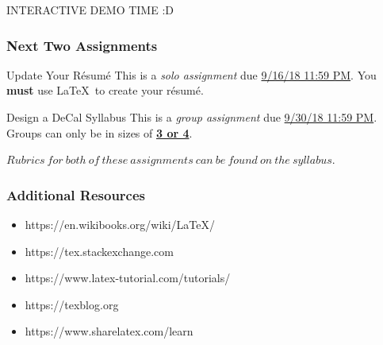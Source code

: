 \documentclass[10pt,xcolor={table,dvipsnames},t]{beamer}
\begin{document}
\begin{frame}
\Huge{INTERACTIVE DEMO TIME :D}
\end{frame}

\begin{frame}
\frametitle{Next Two Assignments}
\begin{block}{Update Your R\'esum\'e}
This is a \textit{solo assignment} due \underline{9/16/18 11:59 PM}. You \textbf{must} use \LaTeX \ to create your r\'esum\'e.
\end{block}

\begin{block}{Design a DeCal Syllabus}
This is a \textit{group assignment} due \underline{9/30/18 11:59 PM}. Groups can only be in sizes of \textbf{\underline{3 or 4}}.\newline
\end{block} $Rubrics\ for\ both\ of\ these\ assignments\ can\ be\ found\ on\ the\ syllabus.$
\end{frame}

\begin{frame}
\frametitle{Additional Resources}
\begin{itemize}
\item https://en.wikibooks.org/wiki/LaTeX/
\newline
\item https://tex.stackexchange.com
\newline
\item https://www.latex-tutorial.com/tutorials/
\newline
\item https://texblog.org
\newline
\item https://www.sharelatex.com/learn
\end{itemize}
\end{frame}
\end{document}
